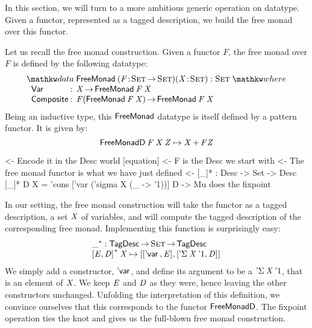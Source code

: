 In this section, we will turn to a more ambitious generic operation on
datatype. Given a functor, represented as a tagged description, we
build the free monad over this functor.

\newcommand{\FMFreeMonad}{\D{FreeMonad}}
\newcommand{\FMFreeMonadD}{\D{FreeMonadD}}
\newcommand{\FMVar}{\C{Var}}
\newcommand{\FMComposite}{\C{Composite}}

Let us recall the free monad construction. Given a functor $F$, the
free monad over $F$ is defined by the following datatype:
%
\[
\stk{
\data \FMFreeMonad\: \PITEL{\V{F}}{\Set \To \Set} 
                     \PITEL{\V{X}}{\Set} :
                     \Set 
\where \\
\;\;\begin{array}{@{}l@{\::\:\:}l@{\quad}l}
    \FMVar           & \V{X} \To \FMFreeMonad\: \V{F}\: \V{X}                            \\
    \FMComposite     & \V{F} (\FMFreeMonad\: \V{F}\: \V{X}) \To \FMFreeMonad\: \V{F}\: \V{X}    
\end{array}
}
\]
%
Being an inductive type, this $\FMFreeMonad$ datatype is itself
defined by a pattern functor. It is given by:
%
\[
\FMFreeMonadD\: \V{F}\: \V{X}\: \V{Z} \mapsto \V{X} \mathop{\D{+}} \V{F} \V{Z}
\]

\begin{wstructure}
    <- Encode it in the Desc world [equation]
        <- F is the Desc we start with
        <- The free monad functor is what we have just defined
        <- [\_]* : Desc -> Set -> Desc
           [\_]* D X = 'cons ['var ('sigma X (\_ -> '1))] D
        -> Mu does the fixpoint
\end{wstructure}

In our setting, the free monad construction will take the functor as a
tagged description, a set $\V{X}$ of variables, and will compute the
tagged description of the corresponding free monad. Implementing this
function is surprisingly easy:
%
\[\stk{
\FreeMonad{\_} : \TagDesc \To \Set \To \TagDesc \\
\FreeMonad{\pair{\V{E}}{\V{D}}{}}\:\V{X} \mapsto
    \pair{\pair{\DVar{}}{\V{E}}{}}
         {\pair{\DSigma{\V{X}}{\DUnit}}{\V{D}}{}}{}
}\]
%
We simply add a constructor, $\DVar{\!}$, and define its argument to
be a $\DSigma{\V{X}}{\DUnit}$, that is an element of $\V{X}$. We keep
$\V{E}$ and $\V{D}$ as they were, hence leaving the other constructors
unchanged. Unfolding the interpretation of this definition, we
convince ourselves that this corresponds to the functor
$\FMFreeMonadD$. The fixpoint operation ties the knot and gives us
the full-blown free monad construction.

